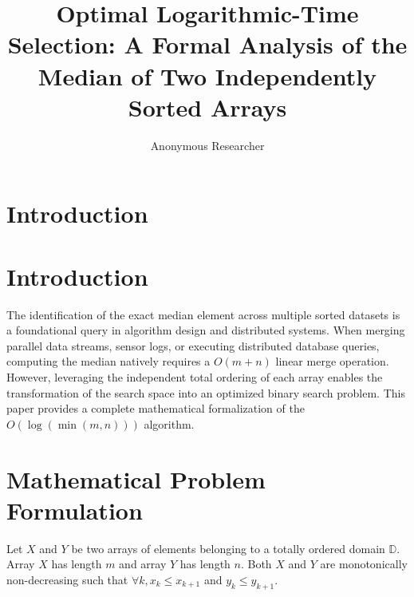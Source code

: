 \documentclass[10pt,journal,compsoc]{IEEEtran}
\begin{document}
\title{Optimal Logarithmic-Time Selection: A Formal Analysis of the Median of Two Independently Sorted Arrays}

\author{ Anonymous Researcher }


\maketitle
\IEEEdisplaynontitleabstractindextext
\IEEEpeerreviewmaketitle

\section{Introduction}

\section{Introduction}
The identification of the exact median element across multiple sorted datasets is a foundational query in algorithm design and distributed systems. When merging parallel data streams, sensor logs, or executing distributed database queries, computing the median natively requires a $O(m+n)$ linear merge operation. However, leveraging the independent total ordering of each array enables the transformation of the search space into an optimized binary search problem. This paper provides a complete mathematical formalization of the $O(\log(\min(m, n)))$ algorithm.

\section{Mathematical Problem Formulation}
Let $X$ and $Y$ be two arrays of elements belonging to a totally ordered domain $\mathbb{D}$. Array $X$ has length $m$ and array $Y$ has length $n$. Both $X$ and $Y$ are monotonically non-decreasing such that $\forall k, x_k \le x_{k+1}$ and $y_k \le y_{k+1}$.
\end{document}
